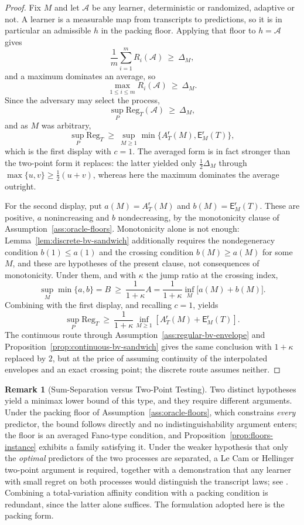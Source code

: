 \documentclass[12pt]{article}
\theoremstyle{definition}
\newtheorem{remark}[theorem]{Remark}
\newcommand{\Reg}{\mathrm{Reg}}
\newcommand{\Est}{\mathsf E}
\newcommand{\Aapp}{A_T}
\begin{document}
\begin{proof}
Fix $M$ and let $\mathcal A$ be any learner, deterministic or randomized,
adaptive or not.  A learner is a measurable map from transcripts to
predictions, so it is in particular an admissible $h$ in the packing floor.
Applying that floor to $h=\mathcal A$ gives
\[
\frac1m\sum_{i=1}^{m}R_i(\mathcal A)\ \ge\ \Delta_M ,
\]
and a maximum dominates an average, so
\[
\max_{1\le i\le m}R_i(\mathcal A)\ \ge\ \Delta_M .
\]
Since the adversary may select the process,
\[
\sup_P\Reg_T(\mathcal A)\ \ge\ \Delta_M ,
\]
and as $M$ was arbitrary,
\[
\sup_P\Reg_T
\ \ge\
\sup_{M\ge1}
\min\bigl\{\Aapp^{\mathsf r}(M),\Est_M^{\mathsf r}(T)\bigr\},
\]
which is the first display with $c=1$.  The averaged form is in fact stronger
than the two-point form it replaces: the latter yielded only
$\tfrac12\Delta_M$ through $\max\{u,v\}\ge\tfrac12(u+v)$, whereas here the
maximum dominates the average outright.

For the second display, put $a(M)=\Aapp^{\mathsf r}(M)$ and
$b(M)=\Est_M^{\mathsf r}(T)$.  These are positive, $a$ nonincreasing and $b$
nondecreasing, by the monotonicity clause of
Assumption~\ref{ass:oracle-floors}.  Monotonicity alone is not enough:
Lemma~\ref{lem:discrete-bv-sandwich} additionally requires the nondegeneracy
condition $b(1)\le a(1)$ and the crossing condition $b(M)\ge a(M)$ for some
$M$, and these are hypotheses of the present clause, not consequences of
monotonicity.  Under them, and with $\kappa$ the jump ratio at the crossing
index,
\[
\sup_M\min\{a,b\}=B\ \ge\ \frac{1}{1+\kappa}A
=\frac{1}{1+\kappa}\inf_M\bigl[a(M)+b(M)\bigr].
\]
Combining with the first display, and recalling $c=1$, yields
\[
\sup_P\Reg_T
\ \ge\
\frac{1}{1+\kappa}
\inf_{M\ge1}
\left[\Aapp^{\mathsf r}(M)+\Est_M^{\mathsf r}(T)\right].
\]
The continuous route through
Assumption~\ref{ass:regular-bv-envelope} and
Proposition~\ref{prop:continuous-bv-sandwich} gives the same conclusion with
$1+\kappa$ replaced by $2$, but at the price of assuming continuity of the
interpolated envelopes and an exact crossing point; the discrete route assumes
neither.
\end{proof}

\begin{remark}[Sum-Separation versus Two-Point Testing]
\label{rem:oracle-no-lecam}
Two distinct hypotheses yield a minimax lower bound of this type, and they
require different arguments.  Under the packing floor of
Assumption~\ref{ass:oracle-floors}, which constrains \emph{every} predictor,
the bound follows directly and no indistinguishability argument enters; the
floor is an averaged Fano-type condition, and
Proposition~\ref{prop:floors-instance} exhibits a family satisfying it.  Under
the weaker hypothesis that only the \emph{optimal} predictors of the two
processes are separated, a Le Cam or Hellinger two-point argument is required,
together with a demonstration that any learner with small regret on both
processes would distinguish the transcript laws; see
\cite[Ch.~2]{tsybakov2009}.  Combining a total-variation affinity condition
with a packing condition is redundant, since the latter alone suffices.
The formulation adopted here is the packing form.
\end{remark}
\end{document}
